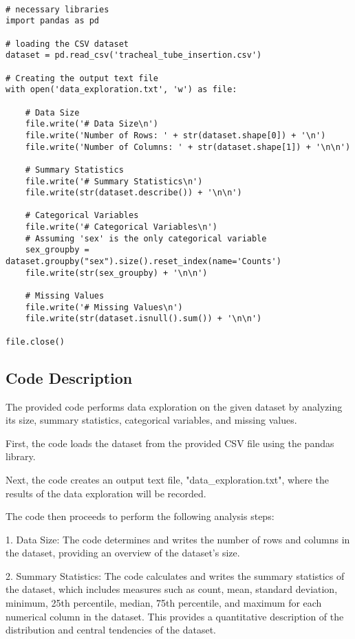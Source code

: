 \documentclass[11pt]{article}
\begin{document}
\begin{verbatim}

# necessary libraries
import pandas as pd

# loading the CSV dataset
dataset = pd.read_csv('tracheal_tube_insertion.csv')

# Creating the output text file
with open('data_exploration.txt', 'w') as file:
    
    # Data Size
    file.write('# Data Size\n')
    file.write('Number of Rows: ' + str(dataset.shape[0]) + '\n')
    file.write('Number of Columns: ' + str(dataset.shape[1]) + '\n\n')
    
    # Summary Statistics
    file.write('# Summary Statistics\n')
    file.write(str(dataset.describe()) + '\n\n')
    
    # Categorical Variables
    file.write('# Categorical Variables\n')
    # Assuming 'sex' is the only categorical variable
    sex_groupby = dataset.groupby("sex").size().reset_index(name='Counts')
    file.write(str(sex_groupby) + '\n\n')
    
    # Missing Values
    file.write('# Missing Values\n')
    file.write(str(dataset.isnull().sum()) + '\n\n')

file.close()

\end{verbatim}

\subsection{Code Description}

The provided code performs data exploration on the given dataset by analyzing its size, summary statistics, categorical variables, and missing values.

First, the code loads the dataset from the provided CSV file using the pandas library.

Next, the code creates an output text file, "data\_exploration.txt", where the results of the data exploration will be recorded.

The code then proceeds to perform the following analysis steps:

1. Data Size:
   The code determines and writes the number of rows and columns in the dataset, providing an overview of the dataset's size.

2. Summary Statistics:
   The code calculates and writes the summary statistics of the dataset, which includes measures such as count, mean, standard deviation, minimum, 25th percentile, median, 75th percentile, and maximum for each numerical column in the dataset. This provides a quantitative description of the distribution and central tendencies of the dataset.
\end{document}
